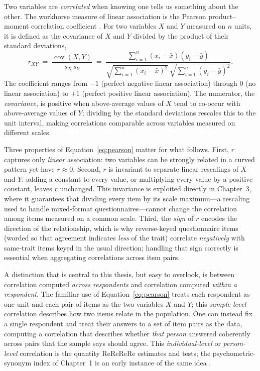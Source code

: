 \documentclass[doc,11pt,donotrepeattitle]{apa7}
\begin{document}
Two variables are \emph{correlated} when knowing one tells us something about
the other. The workhorse measure of linear association is the Pearson
product--moment correlation coefficient \parencite{pearson1896mathematical}.
For two variables $X$ and $Y$ measured on $n$ units, it is defined as the
covariance of $X$ and $Y$ divided by the product of their standard deviations,
\begin{equation}
r_{XY} \;=\; \frac{\operatorname{cov}(X,Y)}{s_X\, s_Y}
\;=\; \frac{\sum_{i=1}^{n}(x_i-\bar{x})(y_i-\bar{y})}
{\sqrt{\sum_{i=1}^{n}(x_i-\bar{x})^2}\,\sqrt{\sum_{i=1}^{n}(y_i-\bar{y})^2}} .
\label{eq:pearson}
\end{equation}
The coefficient ranges from $-1$ (perfect negative linear association) through
$0$ (no linear association) to $+1$ (perfect positive linear association). The
numerator, the \emph{covariance}, is positive when above-average values of $X$
tend to co-occur with above-average values of $Y$; dividing by the standard
deviations rescales this to the unit interval, making correlations comparable
across variables measured on different scales.

Three properties of Equation~\ref{eq:pearson} matter for what follows. First,
$r$ captures only \emph{linear} association: two variables can be strongly
related in a curved pattern yet have $r \approx 0$. Second, $r$ is invariant to
separate linear rescalings of $X$ and $Y$: adding a constant to every value, or
multiplying every value by a positive constant, leaves $r$ unchanged. This
invariance is exploited directly in Chapter~3, where it guarantees that
dividing every item by its scale maximum---a rescaling used to handle
mixed-format questionnaires---cannot change the correlation among items measured
on a common scale. Third, the \emph{sign} of $r$ encodes the direction of the
relationship, which is why reverse-keyed questionnaire items (worded so that
agreement indicates \emph{less} of the trait) correlate \emph{negatively} with
same-trait items keyed in the usual direction; handling that sign correctly is
essential when aggregating correlations across item pairs.

A distinction that is central to this thesis, but easy to overlook, is between
correlation computed \emph{across respondents} and correlation computed
\emph{within a respondent}. The familiar use of Equation~\ref{eq:pearson} treats
each respondent as one unit and each pair of items as the two variables $X$ and
$Y$; this \emph{sample-level} correlation describes how two items relate in the
population. One can instead fix a single respondent and treat their answers to a
set of item pairs as the data, computing a correlation that describes whether
\emph{that person} answered coherently across pairs that the sample says should
agree. This \emph{individual-level} or \emph{person-level} correlation is the
quantity ReReReRe estimates and tests; the psychometric-synonym index of
Chapter~1 is an early instance of the same idea
\parencite{meade2012identifying}.
\end{document}
